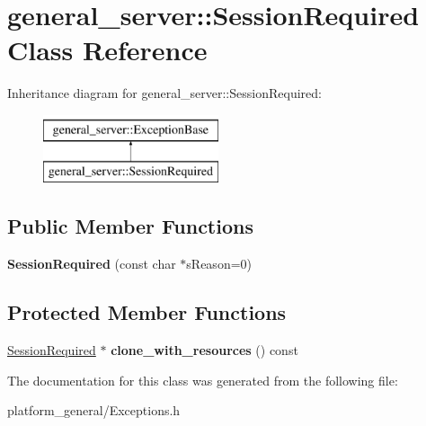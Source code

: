 \hypertarget{classgeneral__server_1_1SessionRequired}{\section{general\-\_\-server\-:\-:\-Session\-Required \-Class \-Reference}
\label{classgeneral__server_1_1SessionRequired}
}
\-Inheritance diagram for general\-\_\-server\-:\-:\-Session\-Required\-:\begin{figure}[H]
\begin{center}
\leavevmode
\includegraphics[height=2.000000cm]{classgeneral__server_1_1SessionRequired}
\end{center}
\end{figure}
\subsection*{\-Public \-Member \-Functions}
\begin{DoxyCompactItemize}
\item 
\hypertarget{classgeneral__server_1_1SessionRequired_aa3ef4c515274fd70ef31278a955703c4}{{\bfseries \-Session\-Required} (const char $\ast$s\-Reason=0)}\label{classgeneral__server_1_1SessionRequired_aa3ef4c515274fd70ef31278a955703c4}

\end{DoxyCompactItemize}
\subsection*{\-Protected \-Member \-Functions}
\begin{DoxyCompactItemize}
\item 
\hypertarget{classgeneral__server_1_1SessionRequired_a841f9d3e370ad7164a7c543ba5bf269e}{\hyperlink{classgeneral__server_1_1SessionRequired}{\-Session\-Required} $\ast$ {\bfseries clone\-\_\-with\-\_\-resources} () const }\label{classgeneral__server_1_1SessionRequired_a841f9d3e370ad7164a7c543ba5bf269e}

\end{DoxyCompactItemize}


\-The documentation for this class was generated from the following file\-:\begin{DoxyCompactItemize}
\item 
platform\-\_\-general/\-Exceptions.\-h\end{DoxyCompactItemize}
